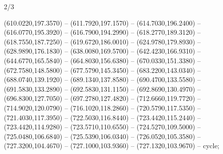 \begin{flagdescription}{2/3}
\begin{scope}[xshift=0.5\flaglength]
\begin{scope}[scale=0.00209\flagwidth,yshift=170mm,xshift=-360]
\begin{scope}[y=-0.8pt, x=0.8pt, inner sep=0pt, outer sep=0pt]
  (610.0220,197.3570) -- (611.7920,197.1570) -- (614.7030,196.2400) --
  (616.0770,195.3920) -- (616.7900,194.2990) -- (618.2770,189.3120) --
  (618.7550,187.7250) -- (619.6720,186.0010) -- (624.9780,179.8930) --
  (628.9890,176.1830) -- (638.0080,169.5700) -- (642.4230,166.9310) --
  (644.6770,165.5840) -- (664.8030,156.6380) -- (670.0330,151.3380) --
  (672.7580,148.5800) -- (677.5790,145.3450) -- (683.2200,143.0340) --
  (688.0740,139.1920) -- (689.1340,137.8580) -- (690.4700,133.5580) --
  (691.5830,133.2890) -- (692.5830,131.1150) -- (692.8690,130.4970) --
  (696.8300,127.7050) -- (697.2780,127.4820) -- (712.6660,119.7720) --
  (714.9020,120.0790) -- (716.1020,118.2860) -- (720.5790,117.5350) --
  (721.4030,117.3950) -- (722.5030,116.8440) -- (723.4420,115.2440) --
  (723.4420,114.9280) -- (723.5710,110.6550) -- (724.5270,109.5000) --
  (725.0480,106.6840) -- (725.5390,106.0340) -- (726.0520,105.3580) --
  (727.3200,104.4670) -- (727.1000,103.9360) -- (727.1320,103.9670) -- cycle;
\end{scope}
\end{scope}
\end{scope}
\fi
\framecode{}
\end{flagdescription}
